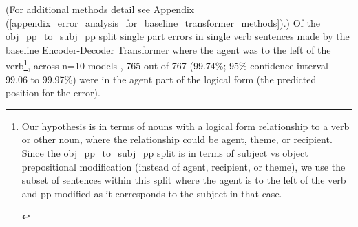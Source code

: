 \documentclass[11pt]{article}
\begin{document}

(For additional methods detail see Appendix (\ref{appendix_error_analysis_for_baseline_transformer_methods}).) Of the obj\_pp\_to\_subj\_pp split single part errors in single verb sentences made by the \cite{Wu2023} baseline Encoder-Decoder Transformer where the agent was to the left of the verb\footnote{\begin{footnotesize}Our hypothesis is in terms of nouns with a logical form relationship to a verb or other noun, where the relationship could be agent, theme, or recipient.
Since the obj\_pp\_to\_subj\_pp split is in terms of subject vs object prepositional modification (instead of agent, recipient, or theme), we use the subset of sentences within this split where the agent is to the left of the verb and pp-modified as it corresponds to the subject in that case.
\end{footnotesize}
}, 
across n=10 models
, 765 out of 767 (99.74\%; 95\% confidence interval 99.06 to 99.97\%) were in the agent part of the logical form (the predicted position for the error).
\end{document}
